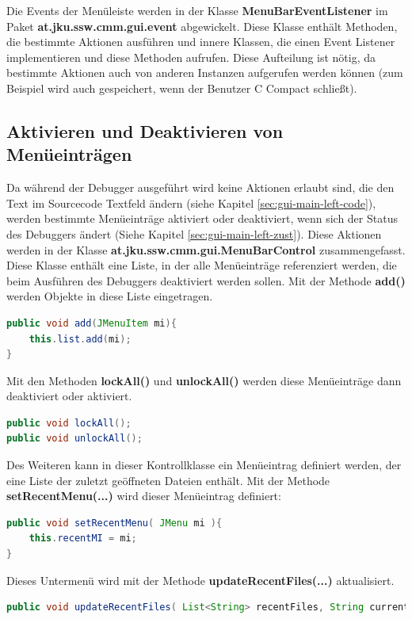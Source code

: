 Die Events der Menüleiste werden in der Klasse \textbf{MenuBarEventListener} im Paket \textbf{at.jku.ssw.cmm.gui.event} abgewickelt. Diese Klasse enthält Methoden, die bestimmte Aktionen ausführen und innere Klassen, die einen Event Listener implementieren und diese Methoden aufrufen. Diese Aufteilung ist nötig, da bestimmte Aktionen auch von anderen Instanzen aufgerufen werden können (zum Beispiel wird auch gespeichert, wenn der Benutzer C Compact schließt).

\subsection{Aktivieren und Deaktivieren von Menüeinträgen}
\label{sec:gui-main-menu-ctrl}
Da während der Debugger ausgeführt wird keine Aktionen erlaubt sind, die den Text im Sourcecode Textfeld ändern (siehe Kapitel \ref{sec:gui-main-left-code}), werden bestimmte Menüeinträge aktiviert oder deaktiviert, wenn sich der Status des Debuggers ändert (Siehe Kapitel \ref{sec:gui-main-left-zust}). Diese Aktionen werden in der Klasse \textbf{at.jku.ssw.cmm.gui.MenuBarControl} zusammengefasst. Diese Klasse enthält eine Liste, in der alle Menüeinträge referenziert werden, die beim Ausführen des Debuggers deaktiviert werden sollen. Mit der Methode \textbf{add()} werden Objekte in diese Liste eingetragen.
\begin{lstlisting}[language=JAVA]
public void add(JMenuItem mi){
	this.list.add(mi);
}
\end{lstlisting}

Mit den Methoden \textbf{lockAll()} und \textbf{unlockAll()} werden diese Menüeinträge dann deaktiviert oder aktiviert.

\begin{lstlisting}[language=JAVA]
public void lockAll();
public void unlockAll();
\end{lstlisting}

Des Weiteren kann in dieser Kontrollklasse ein Menüeintrag definiert werden, der eine Liste der zuletzt geöffneten Dateien enthält. Mit der Methode \textbf{setRecentMenu(...)} wird dieser Menüeintrag definiert:
\begin{lstlisting}[language=JAVA]
public void setRecentMenu( JMenu mi ){
	this.recentMI = mi;
}
\end{lstlisting}

Dieses Untermenü wird mit der Methode \textbf{updateRecentFiles(...)} aktualisiert.
\begin{lstlisting}[language=JAVA]
public void updateRecentFiles( List<String> recentFiles, String currentFile );
\end{lstlisting}

